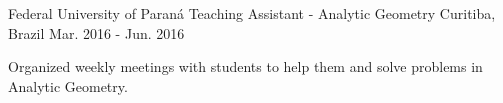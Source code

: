 \begin{cventries}
  \cventry
    {Federal University of Paraná} %
    {Teaching Assistant - Analytic Geometry} %
    {Curitiba, Brazil} %
    {Mar. 2016 - Jun. 2016} %
    {
      \begin{cvitems} %
        \item {Organized weekly meetings with students to help them and solve
        problems in Analytic Geometry.}
      \end{cvitems}
    }

\end{cventries}

